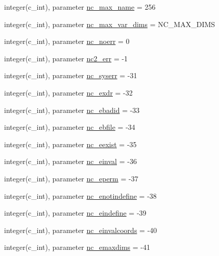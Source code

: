 \begin{DoxyCompactItemize}
\item 
integer(c\+\_\+int), parameter \hyperlink{namespacenetcdf__nc__data_aa2b36a5761a6b83f634fcfb4d2001e3c}{nc\+\_\+max\+\_\+name} = 256
\item 
integer(c\+\_\+int), parameter \hyperlink{namespacenetcdf__nc__data_afbc621b1c8b5a259fa5c4cb9b1478b1f}{nc\+\_\+max\+\_\+var\+\_\+dims} = N\+C\+\_\+\+M\+A\+X\+\_\+\+D\+I\+MS
\item 
integer(c\+\_\+int), parameter \hyperlink{namespacenetcdf__nc__data_a0717db7f9709d4adc72382fbe6ac2e28}{nc\+\_\+noerr} = 0
\item 
integer(c\+\_\+int), parameter \hyperlink{namespacenetcdf__nc__data_ae2af66d271a6023aff95804ef6089c7e}{nc2\+\_\+err} = -\/1
\item 
integer(c\+\_\+int), parameter \hyperlink{namespacenetcdf__nc__data_a734075baec3c30b66779a3ed76bc241f}{nc\+\_\+syserr} = -\/31
\item 
integer(c\+\_\+int), parameter \hyperlink{namespacenetcdf__nc__data_ae944e685a97f40d845c01bca24d8b9d2}{nc\+\_\+exdr} = -\/32
\item 
integer(c\+\_\+int), parameter \hyperlink{namespacenetcdf__nc__data_ae3223e48ebe52d4714f345eb2e168789}{nc\+\_\+ebadid} = -\/33
\item 
integer(c\+\_\+int), parameter \hyperlink{namespacenetcdf__nc__data_a960115687ca85c5f961d7131ced33af5}{nc\+\_\+ebfile} = -\/34
\item 
integer(c\+\_\+int), parameter \hyperlink{namespacenetcdf__nc__data_ae45b7ca9441ed8700786c8b8642be8e5}{nc\+\_\+eexist} = -\/35
\item 
integer(c\+\_\+int), parameter \hyperlink{namespacenetcdf__nc__data_aa263f8b87e0538e1c947b770033b48b4}{nc\+\_\+einval} = -\/36
\item 
integer(c\+\_\+int), parameter \hyperlink{namespacenetcdf__nc__data_a83704d0b26c22b373336ea1e97ad798d}{nc\+\_\+eperm} = -\/37
\item 
integer(c\+\_\+int), parameter \hyperlink{namespacenetcdf__nc__data_a48dc2fa7138496eb1e88d440796aad4c}{nc\+\_\+enotindefine} = -\/38
\item 
integer(c\+\_\+int), parameter \hyperlink{namespacenetcdf__nc__data_ad19d2f76daf245eedf8e951ee0d82a3a}{nc\+\_\+eindefine} = -\/39
\item 
integer(c\+\_\+int), parameter \hyperlink{namespacenetcdf__nc__data_a317c9857752eb82e751a13a1310cffab}{nc\+\_\+einvalcoords} = -\/40
\item 
integer(c\+\_\+int), parameter \hyperlink{namespacenetcdf__nc__data_a2fab3352811943122732cf9dabd6230a}{nc\+\_\+emaxdims} = -\/41

\end{DoxyCompactItemize}

